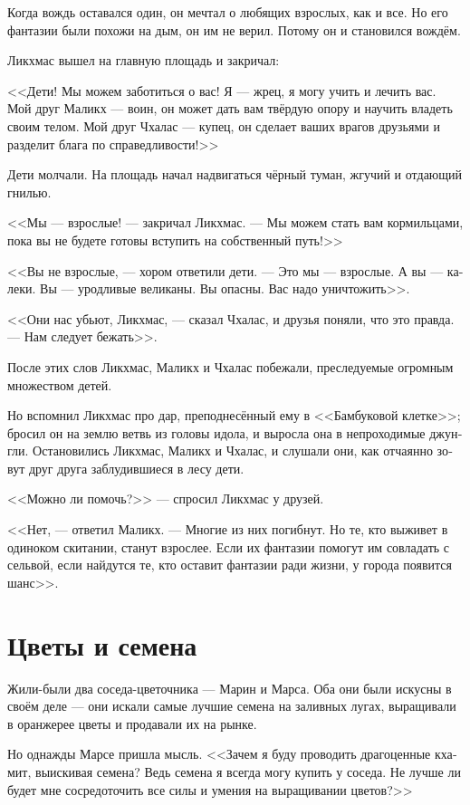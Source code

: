 \documentclass[a4paper,12pt,fleqn]{book}\usepackage{cooltooltips}\usepackage{polyglossia}\setdefaultlanguage[babelshorthands=true]{russian}\setotherlanguage{english}\defaultfontfeatures{Ligatures=TeX,Mapping=tex-text} \usepackage{xcolor}\definecolor{lightgray}{HTML}{bbbbbb}\color{lightgray}\newcommand{\ml}[3]{\textenglish{\textcolor{black}{#3}}}
\newcommand{\textspace}{\vspace{1em}{\centering\Large\bfseries<...>\par}\vspace{1em}}
\begin{document}
{Когда вождь оставался один, он мечтал о любящих взрослых, как и все.
Но его фантазии были похожи на дым, он им не верил.
Потому он и становился вождём.

\textspace

Ликхмас вышел на главную площадь и закричал:

<<Дети!
Мы можем заботиться о вас!
Я --- жрец, я могу учить и лечить вас.
Мой друг Маликх --- воин, он может дать вам твёрдую опору и научить владеть своим телом.
Мой друг Чхалас --- купец, он сделает ваших врагов друзьями и разделит блага по справедливости!>>

Дети молчали.
На площадь начал надвигаться чёрный туман, жгучий и отдающий гнилью.

<<Мы --- взрослые! --- закричал Ликхмас.
--- Мы можем стать вам кормильцами, пока вы не будете готовы вступить на собственный путь!>>

<<Вы не взрослые, --- хором ответили дети.
--- Это мы --- взрослые.
А вы --- калеки.
Вы --- уродливые великаны.
Вы опасны.
Вас надо уничтожить>>.

<<Они нас убьют, Ликхмас, --- сказал Чхалас, и друзья поняли, что это правда.
--- Нам следует бежать>>.

После этих слов Ликхмас, Маликх и Чхалас побежали, преследуемые огромным множеством детей.

Но вспомнил Ликхмас про дар, преподнесённый ему в <<Бамбуковой клетке>>;
бросил он на землю ветвь из головы идола, и выросла она в непроходимые джунгли.
Остановились Ликхмас, Маликх и Чхалас, и слушали они, как отчаянно зовут друг друга заблудившиеся в лесу дети.

<<Можно ли помочь?>> --- спросил Ликхмас у друзей.

<<Нет, --- ответил Маликх.
--- Многие из них погибнут.
Но те, кто выживет в одиноком скитании, станут взрослее.
Если их фантазии помогут им совладать с сельвой, если найдутся те, кто оставит фантазии ради жизни, у города появится шанс>>.

\section{Цветы и семена}

Жили-были два соседа-цветочника --- Марин и Марса.
Оба они были искусны в своём деле --- они искали самые лучшие семена на заливных лугах, выращивали в оранжерее цветы и продавали их на рынке.

Но однажды Марсе пришла мысль.
<<Зачем я буду проводить драгоценные кхамит, выискивая семена?
Ведь семена я всегда могу купить у соседа.
Не лучше ли будет мне сосредоточить все силы и умения на выращивании цветов?>>

}
\end{document}
